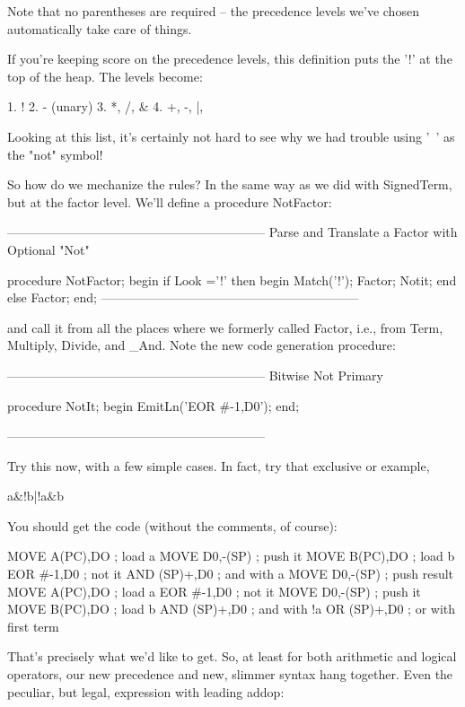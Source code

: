 \documentclass[float=false, crop=false]{standalone}
\begin{document}
Note that no parentheses are required -- the precedence levels we've chosen
automatically take care of things.

If you're keeping score on the precedence levels, this definition puts the '!'
at the top of the heap. The levels become:

1.	!
2.	- (unary)
3.	*, /, \&
4.	+, -, |, ~

Looking at this list, it's certainly not hard to see why we had trouble using
'~' as the "not" symbol!

So how do we mechanize the rules? In the same way as we did with SignedTerm, but
at the factor level. We'll define a procedure NotFactor:

\begin{code}
{--------------------------------------------------------------}
{ Parse and Translate a Factor with Optional "Not" }

procedure NotFactor;
begin
	if Look ='!' then begin
		Match('!');
		Factor;
		Notit;
		end
	else
		Factor;
end;
{--------------------------------------------------------------}
\end{code}

and call it from all the places where we formerly called Factor, i.e., from
Term, Multiply, Divide, and _And. Note the new code generation procedure:

\begin{code}
{--------------------------------------------------------------}
{ Bitwise Not Primary }

procedure NotIt;
begin
	EmitLn('EOR #-1,D0');
end;

{--------------------------------------------------------------}
\end{code}

Try this now, with a few simple cases. In fact, try that exclusive or example,

	a\&!b|!a\&b


You should get the code (without the comments, of course):

 MOVE A(PC),DO    ; load a
 MOVE D0,-(SP)		; push it
 MOVE B(PC),DO		; load b
 EOR #-1,D0		; not it
 AND (SP)+,D0		; and with a
 MOVE D0,-(SP)		; push result
 MOVE A(PC),DO		; load a
 EOR #-1,D0		; not it
 MOVE D0,-(SP)		; push it
 MOVE B(PC),DO		; load b
 AND (SP)+,D0		; and with !a
 OR (SP)+,D0		; or with first term

That's precisely what we'd like to get.  So, at least for both
arithmetic and logical operators, our new precedence and new, slimmer
syntax hang together.  Even the peculiar, but legal, expression with
leading addop:
\end{document}
